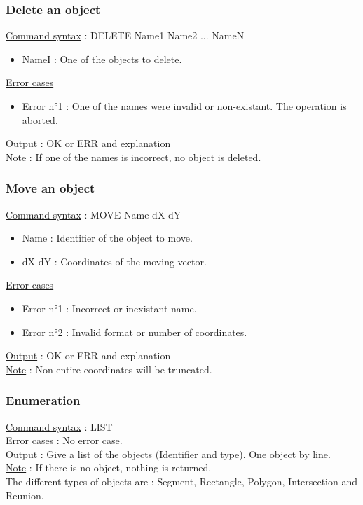 \documentclass[a4paper, 12pts]{article}
\begin{document}
		\subsubsection{Delete an object}
			\uline{Command syntax} :
			DELETE Name1 Name2 ... NameN
			\begin{itemize}
				\item NameI : One of the objects to delete.
			\end{itemize}
			\uline{Error cases}
			\begin{itemize}
				\item Error n°1 : One of the names were invalid or non-existant. The operation is aborted.
			\end{itemize}
			\uline{Output} : OK or ERR and explanation\\
			\uline{Note} : 
			If one of the names is incorrect, no object is deleted.

		\subsubsection{Move an object}
			\uline{Command syntax} :
			MOVE Name dX dY
			\begin{itemize}
				\item Name : Identifier of the object to move.
				\item dX dY : Coordinates of the moving vector.
			\end{itemize}
			\uline{Error cases}
			\begin{itemize}
				\item Error n°1 : Incorrect or inexistant name.
				\item Error n°2 : Invalid format or number of coordinates.
			\end{itemize}
			\uline{Output} : OK or ERR and explanation\\
			\uline{Note} : 
			Non entire coordinates will be truncated.

		\subsubsection{Enumeration}
			\uline{Command syntax} :
			LIST\\
			\uline{Error cases} : No error case.\\
			\uline{Output} : Give a list of the objects (Identifier and type). One object by line.\\
			\uline{Note} : 
			If there is no object, nothing is returned.\\
			The different types of objects are : Segment, Rectangle, Polygon, Intersection and Reunion.
\end{document}
